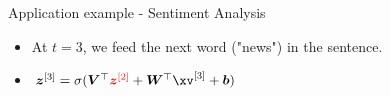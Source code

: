 \begin{frame} {Application example - Sentiment Analysis}
  \begin{itemize}
    \item At $t = 3$, we feed the next word ("news") in the sentence.
    \item $\bm{z}^{[3]} = \sigma(\bm{V}^\top\textcolor{red}{\bm{z}^{[2]}} + \bm{W}^\top \xv^{[3]} + \bm{b})$
  \end{itemize}
  \begin{figure}
      \centering
  \end{figure}
\end{frame}

